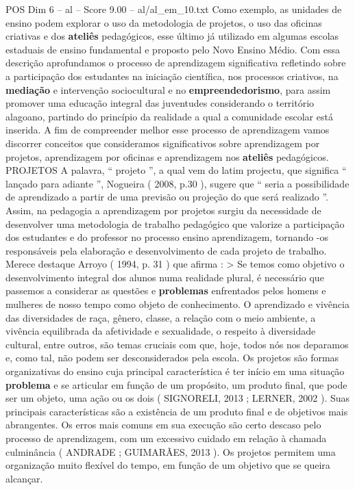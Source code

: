 \begin{textsample}{POS Dim 6 – al – Score 9.00 – al/al\_em\_10.txt}
Como exemplo, as unidades de ensino podem explorar o uso da metodologia de projetos, o uso das oficinas criativas e dos \textbf{ateliês} pedagógicos, esse último já utilizado em algumas escolas estaduais de ensino fundamental e proposto pelo Novo Ensino Médio.
Com essa descrição aprofundamos o processo de aprendizagem significativa refletindo sobre a participação dos estudantes na iniciação científica, nos processos criativos, na \textbf{mediação} e intervenção sociocultural e no \textbf{empreendedorismo}, para assim promover uma educação integral das juventudes considerando o território alagoano, partindo do princípio da realidade a qual a comunidade escolar está inserida.
A fim de compreender melhor esse processo de aprendizagem vamos discorrer conceitos que consideramos significativos sobre aprendizagem por projetos, aprendizagem por oficinas e aprendizagem nos \textbf{ateliês} pedagógicos.
PROJETOS A palavra, “ projeto ”, a qual vem do latim projectu, que significa “ lançado para adiante ”, Nogueira ( 2008, p.30 ), sugere que “ seria a possibilidade de aprendizado a partir de uma previsão ou projeção do que será realizado ”.
Assim, na pedagogia a aprendizagem por projetos surgiu da necessidade de desenvolver uma metodologia de trabalho pedagógico que valorize a participação dos estudantes e do professor no processo ensino aprendizagem, tornando -os responsáveis pela elaboração e desenvolvimento de cada projeto de trabalho.
Merece destaque Arroyo ( 1994, p. 31 ) que afirma : > Se temos como objetivo o desenvolvimento integral dos alunos numa realidade plural, é necessário que passemos a considerar as questões e \textbf{problemas} enfrentados pelos homens e mulheres de nosso tempo como objeto de conhecimento.
O aprendizado e vivência das diversidades de raça, gênero, classe, a relação com o meio ambiente, a vivência equilibrada da afetividade e sexualidade, o respeito à diversidade cultural, entre outros, são temas cruciais com que, hoje, todos nós nos deparamos e, como tal, não podem ser desconsiderados pela escola.
Os projetos são formas organizativas do ensino cuja principal característica é ter início em uma situação \textbf{problema} e se articular em função de um propósito, um produto final, que pode ser um objeto, uma ação ou os dois ( SIGNORELI, 2013 ; LERNER, 2002 ).
Suas principais características são a existência de um produto final e de objetivos mais abrangentes.
Os erros mais comuns em sua execução são certo descaso pelo processo de aprendizagem, com um excessivo cuidado em relação à chamada culminância ( ANDRADE ; GUIMARÃES, 2013 ).
Os projetos permitem uma organização muito flexível do tempo, em função de um objetivo que se queira alcançar.

\end{textsample}
